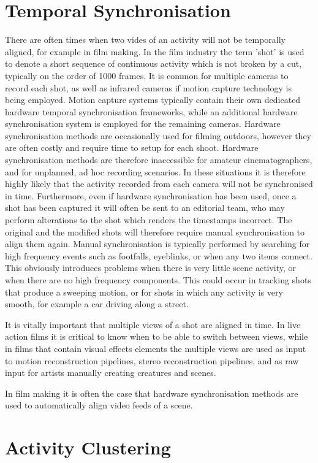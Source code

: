 \section{Temporal Synchronisation}

There are often times when two vides of an activity will not be temporally aligned, for example in film making. In the film industry the term 'shot' is used to denote a short sequence of continuous activity which is not broken by a cut, typically on the order of 1000 frames. It is common for multiple cameras to record each shot, as well as infrared cameras if motion capture technology is being employed. Motion capture systems typically contain their own dedicated hardware temporal synchronisation frameworks, while an additional hardware synchronisation system is employed for the remaining cameras. Hardware synchronisation methods are occasionally used for filming outdoors, however they are often costly and require time to setup for each shoot. Hardware synchronisation methods are therefore inaccessible for amateur cinematographers, and for unplanned, ad hoc recording scenarios. In these situations it is therefore highly likely that the activity recorded from each camera will not be synchronised in time. Furthermore, even if hardware synchronisation has been used, once a shot has been captured it will often be sent to an editorial team, who may perform alterations to the shot which renders the timestamps incorrect. The original and the modified shots will therefore require manual synchronisation to align them again. Manual synchronisation is typically performed by searching for high frequency events such as footfalls, eyeblinks, or when any two items connect. This obviously introduces problems when there is very little scene activity, or when there are no high frequency components. This could occur in tracking shots that produce a sweeping motion, or for shots in which any activity is very smooth, for example a car driving along a street. 

It is vitally important that multiple views of a shot are aligned in time. In live action films it is critical to know when to be able to switch between views, while in films that contain visual effects elements the multiple views are used as input to motion reconstruction pipelines, stereo reconstruction pipelines, and as raw input for artists manually creating creatures and scenes. 

In film making it is often the case that hardware synchronisation methods are used to automatically align video feeds of a scene. 

\section{Activity Clustering}
